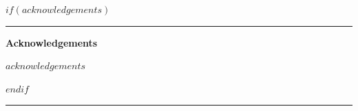 \documentclass[12pt]{article}
\newif\ifhfwghfwg
\newif\ifhfwganon
\begin{document}
\begin{titlepage}
$if(acknowledgements)$
\ifhfwganon\else
\begin{center}
\begin{minipage}{0.9\linewidth}
\footnotesize\singlespacing
\noindent\textcolor{hfwgaccent}{\rule{0.25\textwidth}{0.4pt}}\par
\textbf{Acknowledgements}\par
$acknowledgements$
\end{minipage}
\end{center}
\vspace{1em}
\fi
$endif$

\vfill

\noindent\textcolor{hfwgaccent}{\rule{\textwidth}{2pt}}\par
\end{titlepage}

\else\ifhfwghfwg
\end{document}
